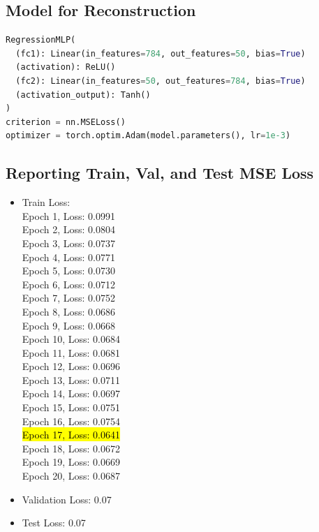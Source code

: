 \begin{solve}

\subsection{Model for Reconstruction}

\begin{lstlisting}[language=python]
RegressionMLP(
  (fc1): Linear(in_features=784, out_features=50, bias=True)
  (activation): ReLU()
  (fc2): Linear(in_features=50, out_features=784, bias=True)
  (activation_output): Tanh()
)
criterion = nn.MSELoss()
optimizer = torch.optim.Adam(model.parameters(), lr=1e-3)
\end{lstlisting}


\subsection{Reporting Train, Val, and Test MSE Loss }

\begin{itemize}
    \item Train Loss:
   \\ Epoch 1, Loss: 0.0991
   \\ Epoch 2, Loss: 0.0804
   \\ Epoch 3, Loss: 0.0737
   \\ Epoch 4, Loss: 0.0771
   \\ Epoch 5, Loss: 0.0730
   \\ Epoch 6, Loss: 0.0712
   \\ Epoch 7, Loss: 0.0752
   \\ Epoch 8, Loss: 0.0686
   \\ Epoch 9, Loss: 0.0668
   \\ Epoch 10, Loss: 0.0684
   \\ Epoch 11, Loss: 0.0681
   \\ Epoch 12, Loss: 0.0696
   \\ Epoch 13, Loss: 0.0711
   \\ Epoch 14, Loss: 0.0697
   \\ Epoch 15, Loss: 0.0751
   \\ Epoch 16, Loss: 0.0754
   \\ \hl{Epoch 17, Loss: 0.0641}
   \\ Epoch 18, Loss: 0.0672
   \\ Epoch 19, Loss: 0.0669
   \\ Epoch 20, Loss: 0.0687
    \item Validation Loss:  0.07
    \item Test Loss:  0.07
\end{itemize}


\end{solve}
